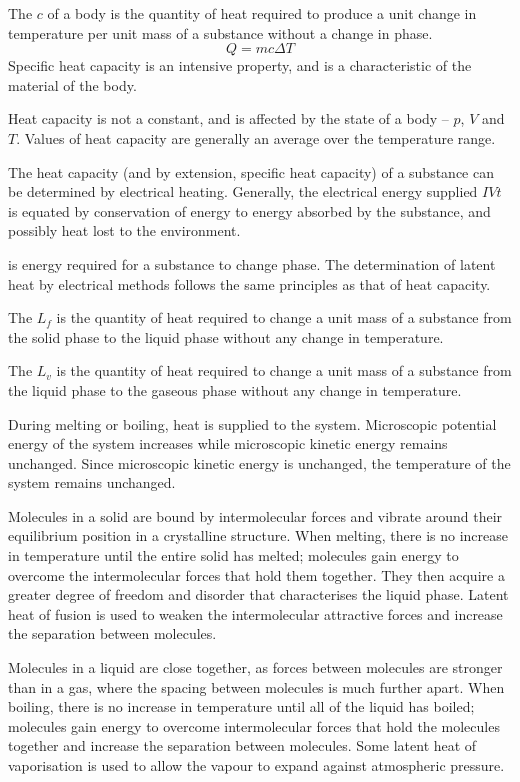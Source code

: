 \documentclass[Physics.tex]{subfiles}
\begin{document}
The  \(c\) of a body is the quantity of heat required to produce a unit change in temperature per unit mass of a substance without a change in phase. \begin{equation}Q = mc\Delta T\end{equation} Specific heat capacity is an intensive property, and is a characteristic of the material of the body.

Heat capacity is not a constant, and is affected by the state of a body -- \(p\), \(V\) and \(T\). Values of heat capacity are generally an average over the temperature range.

The heat capacity (and by extension, specific heat capacity) of a substance can be determined by electrical heating. Generally, the electrical energy supplied \(IVt\) is equated by conservation of energy to energy absorbed by the substance, and possibly heat lost to the environment.

 is energy required for a substance to change phase. The determination of latent heat by electrical methods follows the same principles as that of heat capacity.

The  \(L_f\) is the quantity of heat required to change a unit mass of a substance from the solid phase to the liquid phase without any change in temperature.

The  \(L_v\) is the quantity of heat required to change a unit mass of a substance from the liquid phase to the gaseous phase without any change in temperature.

During melting or boiling, heat is supplied to the system. Microscopic potential energy of the system increases while microscopic kinetic energy remains unchanged. Since microscopic kinetic energy is unchanged, the temperature of the system remains unchanged.

Molecules in a solid are bound by intermolecular forces and vibrate around their equilibrium position in a crystalline structure. When melting, there is no increase in temperature until the entire solid has melted; molecules gain energy to overcome the intermolecular forces that hold them together. They then acquire a greater degree of freedom and disorder that characterises the liquid phase. Latent heat of fusion is used to weaken the intermolecular attractive forces and increase the separation between molecules.

Molecules in a liquid are close together, as forces between molecules are stronger than in a gas, where the spacing between molecules is much further apart. When boiling, there is no increase in temperature until all of the liquid has boiled; molecules gain energy to overcome intermolecular forces that hold the molecules together and increase the separation between molecules. Some latent heat of vaporisation is used to allow the vapour to expand against atmospheric pressure.
\end{document}
